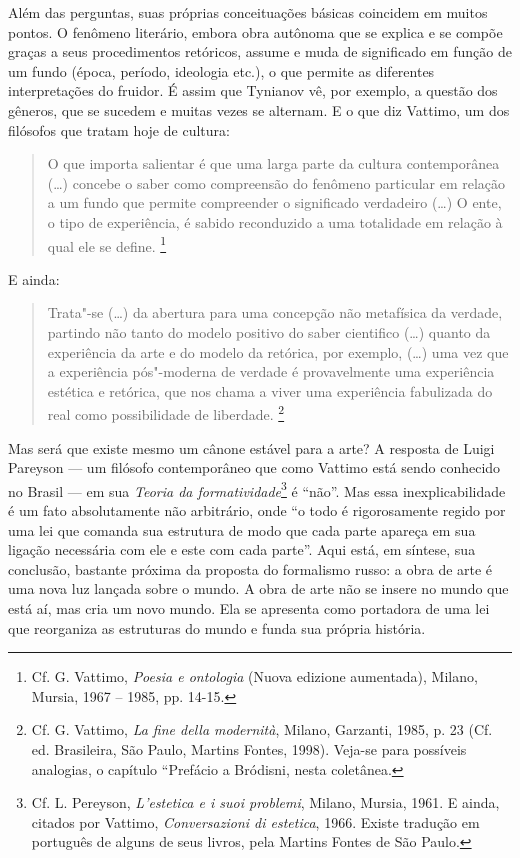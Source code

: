 {Além das perguntas, suas próprias conceituações básicas coincidem em
muitos pontos. O fenômeno literário, embora obra autônoma que se explica
e se compõe graças a seus procedimentos retóricos, assume e muda de
significado em função de um fundo (época, período, ideologia etc.), o
que permite as diferentes interpretações do fruidor. É assim que
Tynianov vê, por exemplo, a questão dos gêneros, que se sucedem e muitas
vezes se alternam. E o que diz Vattimo, um dos filósofos que tratam hoje
de cultura:

\begin{quote}
O que importa salientar é que uma larga parte da cultura contemporânea
(\ldots{}) concebe o saber como compreensão do fenômeno particular em
relação a um fundo que permite compreender o significado verdadeiro
(\ldots{}) O ente, o tipo de experiência, é sabido reconduzido a uma
totalidade em relação à qual ele se define. \footnote{Cf. G. Vattimo,
  \emph{Poesia e ontologia} (Nuova edizione aumentada), Milano, Mursia,
  1967 -- 1985, pp. 14-15.}
\end{quote}

E ainda:

\begin{quote}
Trata"-se (\ldots{}) da abertura para uma concepção não metafísica da
verdade, partindo não tanto do modelo positivo do saber cientifico
(\ldots{}) quanto da experiência da arte e do modelo da retórica, por
exemplo, (\ldots{}) uma vez que a experiência pós"-moderna de verdade é
provavelmente uma experiência estética e retórica, que nos chama a viver
uma experiência fabulizada do real como possibilidade de liberdade.
\footnote{Cf. G. Vattimo, \emph{La fine della modernità}, Milano,
  Garzanti, 1985, p. 23 (Cf. ed. Brasileira, São Paulo, Martins Fontes,
  1998). Veja-se para possíveis analogias, o capítulo ``Prefácio a
  Bródisni, nesta coletânea.}
\end{quote}

Mas será que existe mesmo um cânone estável para a arte? A resposta de
Luigi Pareyson --- um filósofo contemporâneo que como Vattimo está sendo
conhecido no Brasil --- em sua \emph{Teoria da formatividade}\footnote{Cf.
  L. Pereyson, \emph{L'estetica e i suoi problemi}, Milano, Mursia,
  1961. E ainda, citados por Vattimo, \emph{Conversazioni di estetica},
  1966. Existe tradução em português de alguns de seus livros, pela
  Martins Fontes de São Paulo.} é ``não''. Mas essa inexplicabilidade é
um fato absolutamente não arbitrário, onde ``o todo é rigorosamente
regido por uma lei que comanda sua estrutura de modo que cada parte
apareça em sua ligação necessária com ele e este com cada parte''. Aqui
está, em síntese, sua conclusão, bastante próxima da proposta do
formalismo russo: a obra de arte é uma nova luz lançada sobre o mundo. A
obra de arte não se insere no mundo que está aí, mas cria um novo mundo.
Ela se apresenta como portadora de uma lei que reorganiza as estruturas
do mundo e funda sua própria história.

}
